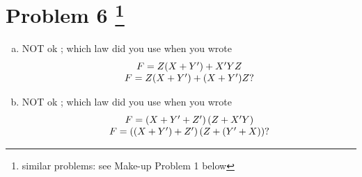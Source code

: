 \documentclass[10pt]{article} %
\begin{document}
\section*{Problem 6  \footnote{similar problems: see Make-up Problem 1 below}}
\begin{enumerate}[(a)]
  \item NOT ok
    ; which law did you use when you wrote\begin{equation*}
      \begin{array}[]{c}
      F=Z(X+Y')+X'YZ\\
      F=Z(X+Y')+(X+Y')Z?
      \end{array}
    \end{equation*}
  \item NOT ok
    ; which law did you use when you wrote\begin{equation*}
      \begin{array}[]{c}
        F=\left( X+Y'+Z' \right)\left( Z+X'Y \right)\\
        F=\left( \left( X+Y' \right)+Z' \right)\left( Z+\left( Y'+X \right) \right)?
      \end{array}
    \end{equation*}
\end{enumerate}
\end{document}
